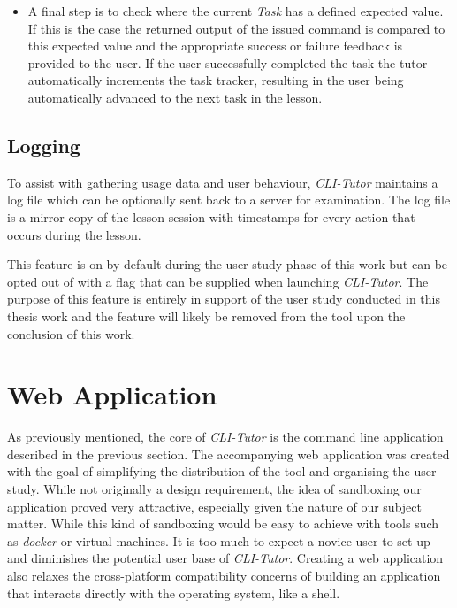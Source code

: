 \begin{itemize}
    \item A final step is to check where the current \textit{Task} has a
        defined expected value. If this is the case the returned output of the
        issued command is compared to this expected value and the appropriate
        success or failure feedback is provided to the user. If the user
        successfully completed the task the tutor automatically increments the
        task tracker, resulting in the user being automatically advanced to the
        next task in the lesson.


\end{itemize}

\subsection{Logging}

To assist with gathering usage data and user behaviour, \textit{CLI-Tutor}
maintains a log file which can be optionally sent back to a server for
examination. The log file is a mirror copy of the lesson session with
timestamps for every action that occurs during the lesson.

This feature is on by default during the user study phase of this work but can
be opted out of with a flag that can be supplied when launching
\textit{CLI-Tutor}. The purpose of this feature is entirely in support of the
user study conducted in this thesis work and the feature will likely be removed
from the tool upon the conclusion of this work.

\section{Web Application}

As previously mentioned, the core of \textit{CLI-Tutor} is the command line
application described in the previous section. The accompanying web application
was created with the goal of simplifying the distribution of the tool and
organising the user study. While not originally a design requirement, the idea
of sandboxing our application proved very attractive, especially given the
nature of our subject matter. While this kind of sandboxing would be easy to
achieve with tools such as \textit{docker} or virtual machines. It is too much
to expect a novice user to set up and diminishes the potential user base of
\textit{CLI-Tutor}. Creating a web application also relaxes the cross-platform
compatibility concerns of building an application that interacts directly with
the operating system, like a shell.


